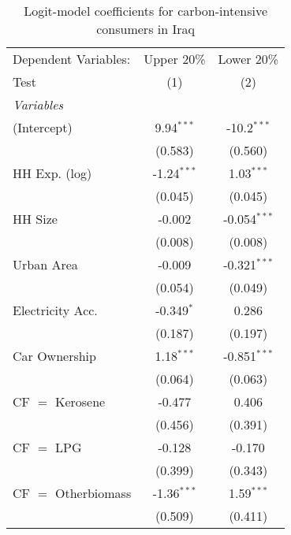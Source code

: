 
\begin{table}[htbp!]
   \centering
   \small
   \begin{adjustbox}{width = 1\textwidth, max height = 0.95\textheight, center}
      \begin{threeparttable}[b]
         \caption{\label{tab:Logit_1_IRQ} Logit-model coefficients for carbon-intensive consumers in Iraq}
         \begin{tabular}{lcc}
            \tabularnewline \midrule \midrule
            Dependent Variables: & Upper 20\%    & Lower 20\%\\   
            Test                 & (1)           & (2)\\  
            \midrule
            \emph{Variables}\\
            (Intercept)          & 9.94$^{***}$  & -10.2$^{***}$\\   
                                 & (0.583)       & (0.560)\\   
            HH Exp. (log)        & -1.24$^{***}$ & 1.03$^{***}$\\   
                                 & (0.045)       & (0.045)\\   
            HH Size              & -0.002        & -0.054$^{***}$\\   
                                 & (0.008)       & (0.008)\\   
            Urban Area           & -0.009        & -0.321$^{***}$\\   
                                 & (0.054)       & (0.049)\\   
            Electricity Acc.     & -0.349$^{*}$  & 0.286\\   
                                 & (0.187)       & (0.197)\\   
            Car Ownership        & 1.18$^{***}$  & -0.851$^{***}$\\   
                                 & (0.064)       & (0.063)\\   
            CF $=$ Kerosene      & -0.477        & 0.406\\   
                                 & (0.456)       & (0.391)\\   
            CF $=$ LPG           & -0.128        & -0.170\\   
                                 & (0.399)       & (0.343)\\   
            CF $=$ Otherbiomass  & -1.36$^{***}$ & 1.59$^{***}$\\   
                                 & (0.509)       & (0.411)\\   

\end{tabular}
\end{threeparttable}
\end{adjustbox}
\end{table}
